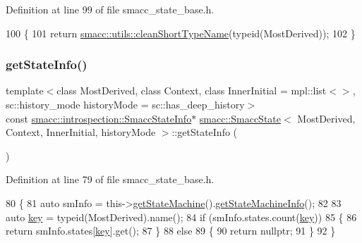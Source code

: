 Definition at line 99 of file smacc\+\_\+state\+\_\+base.\+h.


\begin{DoxyCode}
100   \{
101     \textcolor{keywordflow}{return} \hyperlink{namespacesmacc_1_1utils_aacd1975bb7cd9bec4b50e111a2ae7edb}{smacc::utils::cleanShortTypeName}(\textcolor{keyword}{typeid}(MostDerived));
102   \}
\end{DoxyCode}
\mbox{\label{classsmacc_1_1SmaccState_ab7825f5db39dcbee4e4384913026d3e2}} 
\subsubsection{\texorpdfstring{get\+State\+Info()}{getStateInfo()}}
{\footnotesize\ttfamily template$<$class Most\+Derived, class Context, class Inner\+Initial = mpl\+::list$<$$>$, sc\+::history\+\_\+mode history\+Mode = sc\+::has\+\_\+deep\+\_\+history$>$ \\
const \hyperlink{classsmacc_1_1introspection_1_1SmaccStateInfo}{smacc\+::introspection\+::\+Smacc\+State\+Info}$\ast$ \hyperlink{classsmacc_1_1SmaccState}{smacc\+::\+Smacc\+State}$<$ Most\+Derived, Context, Inner\+Initial, history\+Mode $>$\+::get\+State\+Info (\begin{DoxyParamCaption}{ }\end{DoxyParamCaption})\hspace{0.3cm}{\ttfamily [inline]}}



Definition at line 79 of file smacc\+\_\+state\+\_\+base.\+h.


\begin{DoxyCode}
80   \{
81     \textcolor{keyword}{auto} smInfo = this->\hyperlink{classsmacc_1_1SmaccState_afc39f8e0ca4001b2159a100da2fccd0e}{getStateMachine}().\hyperlink{classsmacc_1_1ISmaccStateMachine_a3b1facb0477325fe43b447fc21d9eb7d}{getStateMachineInfo}();
82 
83     \textcolor{keyword}{auto} \hyperlink{namespacekeyboard__server__node_af0ebd8a9e1564ddc13a227c727602466}{key} = \textcolor{keyword}{typeid}(MostDerived).name();
84     \textcolor{keywordflow}{if} (smInfo.states.count(\hyperlink{namespacekeyboard__server__node_af0ebd8a9e1564ddc13a227c727602466}{key}))
85     \{
86       \textcolor{keywordflow}{return} smInfo.states[\hyperlink{namespacekeyboard__server__node_af0ebd8a9e1564ddc13a227c727602466}{key}].get();
87     \}
88     \textcolor{keywordflow}{else}
89     \{
90       \textcolor{keywordflow}{return} \textcolor{keyword}{nullptr};
91     \}
92   \}
\end{DoxyCode}
\mbox{\label{classsmacc_1_1SmaccState_afc39f8e0ca4001b2159a100da2fccd0e}} 
